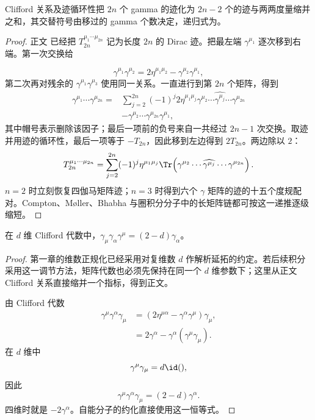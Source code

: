 \begin{lemma}
Clifford 关系及迹循环性把 $2n$ 个 gamma 的迹化为 $2n-2$ 个的迹与两两度量缩并之和，其交替符号由移过的 gamma 个数决定，递归式为。
\end{lemma}
\begin{proof}
正文 已经把 $T_{2n}^{\mu_1\cdots\mu_{2n}}$ 记为长度 $2n$ 的 Dirac 迹。把最左端 $\gamma^{\mu_1}$ 逐次移到右端。第一次交换给

\begin{equation*}
 \gamma^{\mu_1}\gamma^{\mu_2}
 =2\eta^{\mu_1\mu_2}-\gamma^{\mu_2}\gamma^{\mu_1},
\end{equation*}
第二次再对残余的 $\gamma^{\mu_1}\gamma^{\mu_3}$ 使用同一关系。一直进行到第 $2n$ 个矩阵，得到
\begin{align*}
 \gamma^{\mu_1}\cdots\gamma^{\mu_{2n}}
 =&\sum_{j=2}^{2n}(-1)^j 2\eta^{\mu_1\mu_j}
 \gamma^{\mu_2}\cdots\widehat{\gamma^{\mu_j}}\cdots\gamma^{\mu_{2n}}
 \nonumber\\
 &-\gamma^{\mu_2}\cdots\gamma^{\mu_{2n}}\gamma^{\mu_1},
 \end{align*}
其中帽号表示删除该因子；最后一项前的负号来自一共经过 $2n-1$ 次交换。取迹并用迹的循环性，最后一项等于 $-T_{2n}$，因此移到左边得到 $2T_{2n}$。两边除以 $2$：
\begin{equation*}
 {
 T_{2n}^{\mu_1\cdots\mu_{2n}}
 =\sum_{j=2}^{2n}(-1)^j
 \eta^{\mu_1\mu_j}
 \Tr\!\left(
 \gamma^{\mu_2}\cdots\widehat{\gamma^{\mu_j}}\cdots\gamma^{\mu_{2n}}
 \right).}
 \end{equation*}
$n=2$ 时立刻恢复四伽马矩阵迹；$n=3$ 时得到六个 $\gamma$ 矩阵的迹的十五个度规配对。Compton、M\o ller、Bhabha 与圈积分分子中的长矩阵链都可按这一递推逐级缩短。
\end{proof}

\begin{lemma}
在 $d$ 维 Clifford 代数中，$\gamma_\mu\gamma_\alpha\gamma^\mu=(2-d)\gamma_\alpha$。
\end{lemma}
\begin{proof}
第一章的维数正规化已经采用对复维数 $d$ 作解析延拓的约定。若后续积分采用这一调节方法，矩阵代数也必须先保持在同一个 $d$ 维参数下；这里从正文 Clifford 关系直接缩并一个指标，得到正文。



由 Clifford 代数
\begin{align*}
 \gamma^\mu\gamma^\alpha\gamma_\mu
 &=(2\eta^{\mu\alpha}-\gamma^\alpha\gamma^\mu)\gamma_\mu,\\
 &=2\gamma^\alpha-\gamma^\alpha(\gamma^\mu\gamma_\mu).
\end{align*}
在 $d$ 维中
\begin{equation*}
 \gamma^\mu\gamma_\mu=d\id(),
\end{equation*}
因此
\begin{equation*}
 {
 \gamma^\mu\gamma^\alpha\gamma_\mu=(2-d)\gamma^\alpha.}
 \end{equation*}
四维时就是 $-2\gamma^\alpha$。自能分子的约化直接使用这一恒等式。
\end{proof}

